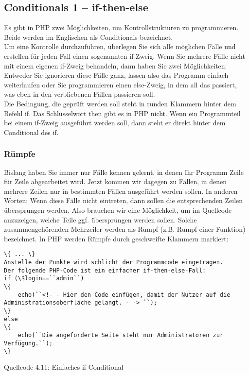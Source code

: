 \subsection{Conditionals 1 – if-then-else}

Es gibt in PHP zwei Möglichkeiten, um Kontrollstrukturen zu programmieren. Beide werden im Englischen als Conditionals bezeichnet.\\


Um eine Kontrolle durchzuführen, überlegen Sie sich alle möglichen Fälle und erstellen für jeden Fall einen sogenannten if-Zweig. Wenn Sie mehrere Fälle nicht mit einem eigenen if-Zweig behandeln, dann haben Sie zwei Möglichkeiten: Entweder Sie ignorieren diese Fälle ganz, lassen also das Programm einfach weiterlaufen oder Sie programmieren einen else-Zweig, in dem all das passiert, was eben in den verbliebenen Fällen passieren soll.\\


Die Bedingung, die geprüft werden soll steht in runden Klammern hinter dem \glqq{}Befehl\grqq{} if. Das Schlüsselwort \glqq{}then\grqq{} gibt es in PHP nicht. Wenn ein Programmteil bei einem if-Zweig ausgeführt werden soll, dann steht er direkt hinter dem Conditional des if.

\subsubsection{Rümpfe}

Bislang haben Sie immer nur Fälle kennen gelernt, in denen Ihr Programm Zeile für Zeile abgearbeitet wird. Jetzt kommen wir dagegen zu Fällen, in denen mehrere Zeilen nur in bestimmten Fällen ausgeführt werden sollen. In anderen Worten: Wenn diese Fälle nicht eintreten, dann sollen die entsprechenden Zeilen übersprungen werden. Also brauchen wir eine Möglichkeit, um im Quellcode anzuzeigen, welche Teile ggf. übersprungen werden sollen. Solche zusammengehörenden Mehrzeiler werden als Rumpf (z.B. Rumpf einer Funktion) bezeichnet. In PHP werden Rümpfe durch geschweifte Klammern markiert: \\

\begin{verbatim}
\{ ... \}
Anstelle der Punkte wird schlicht der Programmcode eingetragen.
Der folgende PHP-Code ist ein einfacher if-then-else-Fall:
if (\$login==``admin``)
\{
	echo(``<!- - Hier den Code einfügen, damit der Nutzer auf die Administrationsoberfläche gelangt. - -> ``);
\}
else 
\{
	echo(``Die angeforderte Seite steht nur Administratoren zur Verfügung.``);
\}
\end{verbatim}
Quellcode 4.11: Einfaches if Conditional

